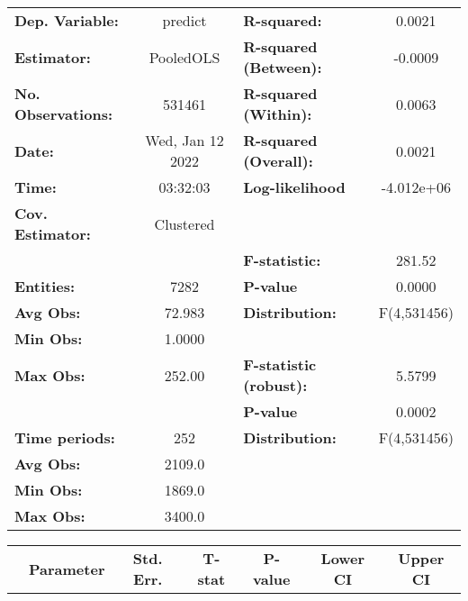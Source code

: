 \begin{center}
\begin{tabular}{lclc}
\toprule
\textbf{Dep. Variable:}    &      predict       & \textbf{  R-squared:         }   &      0.0021      \\
\textbf{Estimator:}        &     PooledOLS      & \textbf{  R-squared (Between):}  &     -0.0009      \\
\textbf{No. Observations:} &       531461       & \textbf{  R-squared (Within):}   &      0.0063      \\
\textbf{Date:}             &  Wed, Jan 12 2022  & \textbf{  R-squared (Overall):}  &      0.0021      \\
\textbf{Time:}             &      03:32:03      & \textbf{  Log-likelihood     }   &    -4.012e+06    \\
\textbf{Cov. Estimator:}   &     Clustered      & \textbf{                     }   &                  \\
\textbf{}                  &                    & \textbf{  F-statistic:       }   &      281.52      \\
\textbf{Entities:}         &        7282        & \textbf{  P-value            }   &      0.0000      \\
\textbf{Avg Obs:}          &       72.983       & \textbf{  Distribution:      }   &   F(4,531456)    \\
\textbf{Min Obs:}          &       1.0000       & \textbf{                     }   &                  \\
\textbf{Max Obs:}          &       252.00       & \textbf{  F-statistic (robust):} &      5.5799      \\
\textbf{}                  &                    & \textbf{  P-value            }   &      0.0002      \\
\textbf{Time periods:}     &        252         & \textbf{  Distribution:      }   &   F(4,531456)    \\
\textbf{Avg Obs:}          &       2109.0       & \textbf{                     }   &                  \\
\textbf{Min Obs:}          &       1869.0       & \textbf{                     }   &                  \\
\textbf{Max Obs:}          &       3400.0       & \textbf{                     }   &                  \\
\bottomrule
\end{tabular}
\begin{tabular}{lcccccc}
                & \textbf{Parameter} & \textbf{Std. Err.} & \textbf{T-stat} & \textbf{P-value} & \textbf{Lower CI} & \textbf{Upper CI}  \\

\end{tabular}
\end{center}
